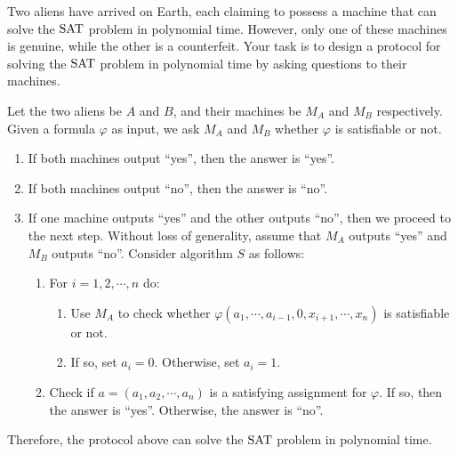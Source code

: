 \documentclass{homework}
\begin{document}
\begin{problem}
  Two aliens have arrived on Earth, each claiming to possess a machine that can
  solve the $\mathrm{SAT}$ problem in polynomial time.
  However, only one of these machines is genuine, while the other is a
  counterfeit.
  Your task is to design a protocol for solving the $\mathrm{SAT}$ problem in polynomial
  time by asking questions to their machines.
\end{problem}

\begin{solution}
  
  Let the two aliens be $A$ and $B$,
  and their machines be $M_{A}$ and $M_{B}$ respectively.
  Given a formula $\varphi$ as input,
  we ask $M_{A}$ and $M_{B}$ whether $\varphi$ is satisfiable or not.
  
  \begin{enumerate}
    \item If both machines output ``yes'', then the answer is ``yes''.
    \item If both machines output ``no'', then the answer is ``no''.
    \item If one machine outputs ``yes'' and the other outputs ``no'',
      then we proceed to the next step. Without loss of generality,
      assume that $M_{A}$ outputs ``yes'' and $M_{B}$ outputs ``no''.
      Consider algorithm $S$ as follows:
      \begin{enumerate}
        \item For $i = 1, 2, \cdots, n$ do:
        \begin{enumerate}
          \item Use $M_{A}$ to check whether
            $\varphi(a_1, \cdots, a_{i-1}, 0, x_{i+1}, \cdots, x_n)$
            is satisfiable or not.
          \item If so, set $a_i = 0$. Otherwise, set $a_i = 1$.
        \end{enumerate}
        \item Check if $a = (a_1, a_2, \cdots, a_n)$ is a satisfying assignment for $\varphi$.
          If so, then the answer is ``yes''. Otherwise, the answer is ``no''.
      \end{enumerate}
  \end{enumerate}
  
  Therefore, the protocol above can solve the $\mathrm{SAT}$ problem in polynomial time.

\end{solution}

\end{document}
